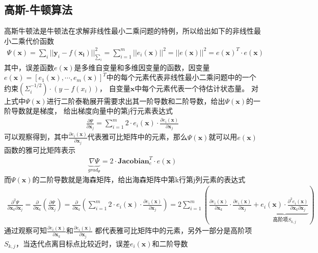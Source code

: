 \documentclass[10pt]{article}
\begin{document}
\subsection{高斯-牛顿算法}
高斯牛顿法是牛顿法在求解非线性最小二乘问题的特例，所以给出如下的非线性最小二乘代价函数
\begin{align} 
    \Psi(\mathbf{x})=\sum_{i}||\mathbf{y}_{i}-f(\mathbf{x_i})||_{\sum_{i}}^{2}=
    \sum_{i=1}^{m}||e_i(\mathbf{x})||^{2}=||e(\mathbf{x})||^{2}=e(\mathbf{x})^{T}\cdot e(\mathbf{x})
\end{align}
其中，误差函数$e(\mathbf{x})$是多维自变量和多维因变量的函数，因变量$e(\mathbf{x})=[e_1(\mathbf{x}),\cdots,
e_m(\mathbf{x})]^{T}$中的每个元素代表非线性最小二乘问题中的一个约束$(\varSigma_{i}^{-1/2})\cdot(y-f(x_i))$，
自变量$\mathbf{x}$中每个元素代表一个待估计状态量。
对上式中$\Psi(\mathbf{x})$进行二阶泰勒展开需要求出其一阶导数和二阶导数，给出$\Psi(\mathbf{x})$的一阶导数就是梯度，
给出梯度向量中的第j行元素表达式
\begin{align} 
    \frac{\partial \Psi}{\partial\mathbf{x}_j}=\sum_{i=1}^{m}2\cdot e_{i}(\mathbf{x})\cdot 
    \frac{\partial e_i(\mathbf{x})}{\partial\mathbf{x}_j}
\end{align}
可以观察得到，其中$\frac{\partial e_i(\mathbf{x})}{\partial\mathbf{x}_j}$代表雅可比矩阵中的元素，那么$\Psi(
\mathbf{x})$就可以用$e(\mathbf{x})$函数的雅可比矩阵表示
\begin{align} 
    \underset{grad_{\Psi}}{\underbrace{\nabla\Psi}}=2\cdot\mathbf{Jacobian}_{e}^{T}\cdot e(\mathbf{x})
\end{align}
而$\Psi(\mathbf{x})$的二阶导数就是海森矩阵，给出海森矩阵中第k行第j列元素的表达式
\begin{align} 
    \frac{\partial^{2}\Psi}{\partial\mathbf{x}_{k}\partial\mathbf{x}_j}=\frac{\partial}{\partial
    \mathbf{x}_k}(\frac{\partial\Psi}{\partial\mathbf{x}_j})=\frac{\partial}{\partial\mathbf{x}_k}
    (\sum_{i=1}^{m}2\cdot e_i(\mathbf{x})\cdot\frac{\partial e_i(\mathbf{x})}{\partial\mathbf{x}_j})
    =2\sum_{i=1}^{m}(\frac{\partial e_i(\mathbf{x})}{\partial\mathbf{x}_k}\cdot
    \frac{\partial e_i(\mathbf{x})}{\partial\mathbf{x}_j}+\underset{\text{高阶项}S_{k,j}}
    {\underbrace{e_i(\mathbf{x})\cdot\frac{\partial^{2}
    e_i(\mathbf{x})}{\partial\mathbf{x}_k \partial\mathbf{x}_j}}})
\end{align}
通过观察可知$\frac{\partial e_i(\mathbf{x})}{\partial\mathbf{x}_k}$和$\frac{\partial e_i(\mathbf{x})}{\partial\mathbf{x}_j}$
都代表雅可比矩阵中的元素，另外一部分是高阶项$S_{k,j}$，当迭代点离目标点比较近时，误差$e_i(\mathbf{x})$和二阶导数
\end{document}
